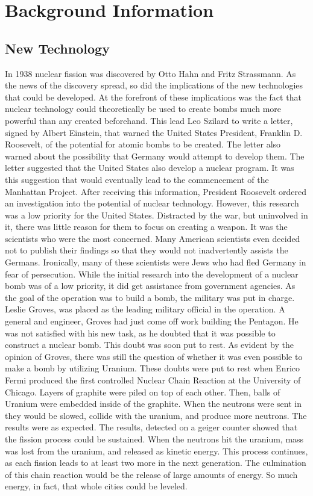 \documentclass[11 pt, twoside]{article}
\begin{document}
\section{Background Information}

\subsection{New Technology}
In 1938 nuclear fission was discovered by Otto Hahn and Fritz Strassmann. As the news of the discovery spread, so did the implications of the new technologies that could be developed. At the forefront of these implications was the fact that nuclear technology could theoretically be used to create bombs much more powerful than any created beforehand. This lead Leo Szilard to write a letter, signed by Albert Einstein, that warned the United States President, Franklin D. Roosevelt, of the potential for atomic bombs to be created. The letter also warned about the possibility that Germany would attempt to develop them. The letter suggested that the United States also develop a nuclear program. It was this suggestion that would eventually lead to the commencement of the Manhattan Project. After receiving this information, President Roosevelt ordered an investigation into the potential of nuclear technology. However, this research was a low priority for the United States. Distracted by the war, but uninvolved in it, there was little reason for them to focus on creating a weapon. It was the scientists who were the most concerned. Many American scientists even decided not to publish their findings so that they would not inadvertently assists the Germans. Ironically, many of these scientists were Jews who had fled Germany in fear of persecution. 
	While the initial research into the development of a nuclear bomb was of a low priority, it did get assistance from government agencies. As the goal of the operation was to build a bomb, the military was put in charge. Leslie Groves, was placed as the leading military official in the operation. A general and engineer, Groves had just come off work building the Pentagon. He was not satisfied with his new task, as he doubted that it was possible to construct a nuclear bomb. This doubt was soon put to rest.
	As evident by the opinion of Groves, there was still the question of whether it was even possible to make a bomb by utilizing Uranium. These doubts were put to rest when Enrico Fermi produced the first controlled Nuclear Chain Reaction at the University of Chicago. Layers of graphite were piled on top of each other. Then, balls of Uranium were embedded inside of the graphite. When the neutrons were sent in they would be slowed, collide with the uranium, and produce more neutrons. The results were as expected. The results, detected on a geiger counter showed that the fission process could be sustained. When the neutrons hit the uranium, mass was lost from the uranium, and released as kinetic energy. This process continues, as each fission leads to at least two more in the next generation. The culmination of this chain reaction would be the release of large amounts of energy. So much energy, in fact, that whole cities could be leveled.
\end{document}
